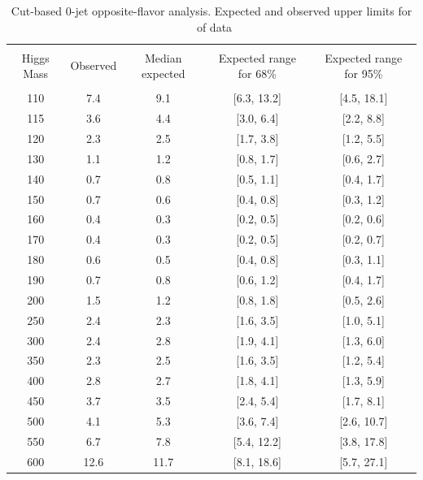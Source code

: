 \begin{table}[!hbp]
\begin{center}
\begin{tabular}{c c c c c}
\hline
\vspace{-3mm} && \\
 Higgs Mass   & Observed & Median expected & Expected range for 68\% & Expected range for 95\%   \\
\vspace{-3mm} && \\
\hline
110 & 7.4 & 9.1 & [6.3, 13.2] & [4.5, 18.1] \\
115 & 3.6 & 4.4 & [3.0, 6.4] & [2.2, 8.8] \\
120 & 2.3 & 2.5 & [1.7, 3.8] & [1.2, 5.5] \\
130 & 1.1 & 1.2 & [0.8, 1.7] & [0.6, 2.7] \\
140 & 0.7 & 0.8 & [0.5, 1.1] & [0.4, 1.7] \\
150 & 0.7 & 0.6 & [0.4, 0.8] & [0.3, 1.2] \\
160 & 0.4 & 0.3 & [0.2, 0.5] & [0.2, 0.6] \\
170 & 0.4 & 0.3 & [0.2, 0.5] & [0.2, 0.7] \\
180 & 0.6 & 0.5 & [0.4, 0.8] & [0.3, 1.1] \\
190 & 0.7 & 0.8 & [0.6, 1.2] & [0.4, 1.7] \\
200 & 1.5 & 1.2 & [0.8, 1.8] & [0.5, 2.6] \\
250 & 2.4 & 2.3 & [1.6, 3.5] & [1.0, 5.1] \\
300 & 2.4 & 2.8 & [1.9, 4.1] & [1.3, 6.0] \\
350 & 2.3 & 2.5 & [1.6, 3.5] & [1.2, 5.4] \\
400 & 2.8 & 2.7 & [1.8, 4.1] & [1.3, 5.9] \\
450 & 3.7 & 3.5 & [2.4, 5.4] & [1.7, 8.1] \\
500 & 4.1 & 5.3 & [3.6, 7.4] & [2.6, 10.7] \\
550 & 6.7 & 7.8 & [5.4, 12.2] & [3.8, 17.8] \\
600 & 12.6 & 11.7 & [8.1, 18.6] & [5.7, 27.1] \\
\hline
\end{tabular}
\caption{Cut-based 0-jet opposite-flavor analysis. Expected and observed
  upper limits for \intlumi\ of data}
\label{tab:of0_cut}
\end{center}
\end{table}

